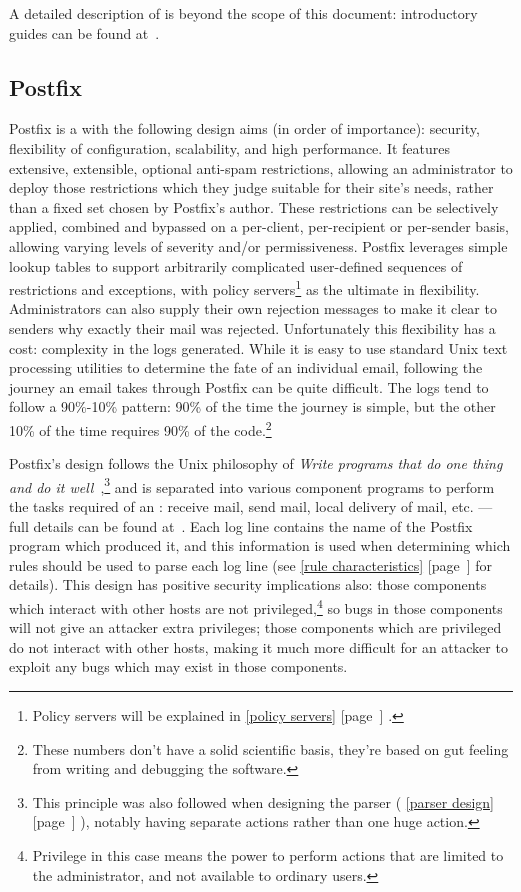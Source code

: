 \documentclass[a4paper,12pt,draft]{article}
\newcommand{\refwithpage}[1]{%
    \empty{}\ref{#1} [page~\pageref{#1}]%
}
\newcommand{\sectionref}[1]{%
    \textsection{}\refwithpage{#1}%
}
\begin{document}
A detailed description of \SMTP{} is beyond the scope of this document:
introductory guides can be found at~\cite{smtp-intro-01, smtp-intro-02}.

\subsection{Postfix}

\label{postfix background}

Postfix is a \MTA{} with the following design aims (in order of
importance): security, flexibility of configuration, scalability, and high
performance.  It features extensive, extensible, optional anti-spam
restrictions, allowing an administrator to deploy those restrictions which
they judge suitable for their site's needs, rather than a fixed set chosen
by Postfix's author.  These restrictions can be selectively applied,
combined and bypassed on a per-client, per-recipient or per-sender basis,
allowing varying levels of severity and/or permissiveness.  Postfix
leverages simple lookup tables to support arbitrarily complicated
user-defined sequences of restrictions and exceptions, with policy
servers\footnote{Policy servers will be explained in \sectionref{policy
servers}.} as the ultimate in flexibility.  Administrators can also supply
their own rejection messages to make it clear to senders why exactly their
mail was rejected.  Unfortunately this flexibility has a cost: complexity
in the logs generated.  While it is easy to use standard Unix text
processing utilities to determine the fate of an individual email,
following the journey an email takes through Postfix can be quite
difficult.  The logs tend to follow a 90\%-10\% pattern: 90\% of the time
the journey is simple, but the other 10\% of the time requires 90\% of the
code.\footnote{These numbers don't have a solid scientific basis, they're
based on gut feeling from writing and debugging the software.}

Postfix's design follows the Unix philosophy of \textit{Write programs that
do one thing and do it well\/}~\cite{unix-philosophy},\footnote{This
principle was also followed when designing the parser (\sectionref{parser
design}), notably having separate actions rather than one huge action.} and
is separated into various component programs to perform the tasks required
of an \MTA{}\@: receive mail, send mail, local delivery of mail, etc. ---
full details can be found at~\cite{postfix-overview}.  Each log line
contains the name of the Postfix program which produced it, and this
information is used when determining which rules should be used to parse
each log line (see \sectionref{rule characteristics} for details).  This
design has positive security implications also: those components which
interact with other hosts are not privileged,\footnote{Privilege in this
case means the power to perform actions that are limited to the
administrator, and not available to ordinary users.} so bugs in those
components will not give an attacker extra privileges; those components
which are privileged do not interact with other hosts, making it much more
difficult for an attacker to exploit any bugs which may exist in those
components.
\end{document}
